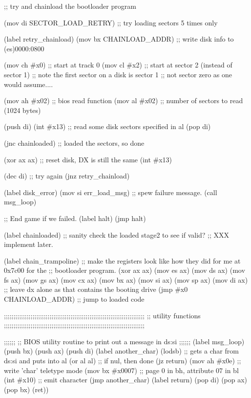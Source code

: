 \documentclass[11pt]{book}
\begin{document}
{    ;; try and chainload the bootloader program

    (mov di SECTOR_LOAD_RETRY)    ;; try loading sectors 5 times only

(label retry_chainload)
    (mov bx CHAINLOAD_ADDR)    ;; write disk info to (es)0000:0800

    (mov ch #x0)            ;; start at track 0
    (mov cl #x2)            ;; start at sector 2 (instead of sector 1)
                            ;; note the first sector on a disk is sector 1
                            ;; not sector zero as one would assume....

    (mov ah #x02)            ;; bios read function
    (mov al #x02)            ;; number of sectors to read  (1024 bytes)

    (push di)
    (int #x13)                ;; read some disk sectors specified in al
    (pop di)

    (jnc chainloaded)        ;; loaded the sectors, so done

    (xor ax ax)                ;; reset disk, DX is still the same
    (int #x13)

    (dec di)                ;; try again
    (jnz retry_chainload)

(label disk_error)
    (mov si err_load_msg)    ;; spew failure message.
    (call msg_loop)

    ;; End game if we failed.
(label halt)
    (jmp halt)

(label chainloaded)
    ;; sanity check the loaded stage2 to see if valid?
    ;; XXX implement later.

(label chain_trampoline)
    ;; make the registers look like how they did for me at 0x7c00 for the
    ;; bootloader program.
    (xor ax ax)
    (mov es ax)
    (mov ds ax)
    (mov fs ax)
    (mov gs ax)
    (mov cx ax)
    (mov bx ax)
    (mov si ax)
    (mov sp ax)
    (mov di ax)
    ;; leave dx alone as that contains the booting drive
    (jmp #x0 CHAINLOAD_ADDR)        ;; jump to loaded code    

    ;;;;;;;;;;;;;;;;;;;;;;;;;;;;;;;;;;;;;;;;;;;;;;;;;;;;;;;;;;;;;;;;;;;;;;;;;;
    ;; utility functions
    ;;;;;;;;;;;;;;;;;;;;;;;;;;;;;;;;;;;;;;;;;;;;;;;;;;;;;;;;;;;;;;;;;;;;;;;;;;

    ;;;;;;
    ;; BIOS utility routine to print out a message in ds:si
    ;;;;;;
(label msg_loop)
    (push bx)
    (push ax)
    (push di)
(label another_char)
    (lodsb)            ;; gets a char from ds:si and puts into al
    (or al al)        ;; if nul, then done
    (jz return)
    (mov ah #x0e)    ;; write 'char' teletype mode
    (mov bx #x0007)    ;; page 0 in bh, attribute 07 in bl
    (int #x10)        ;; emit character
    (jmp another_char)
(label return)
    (pop di)
    (pop ax)
    (pop bx)
    (ret))
}
\end{document}
